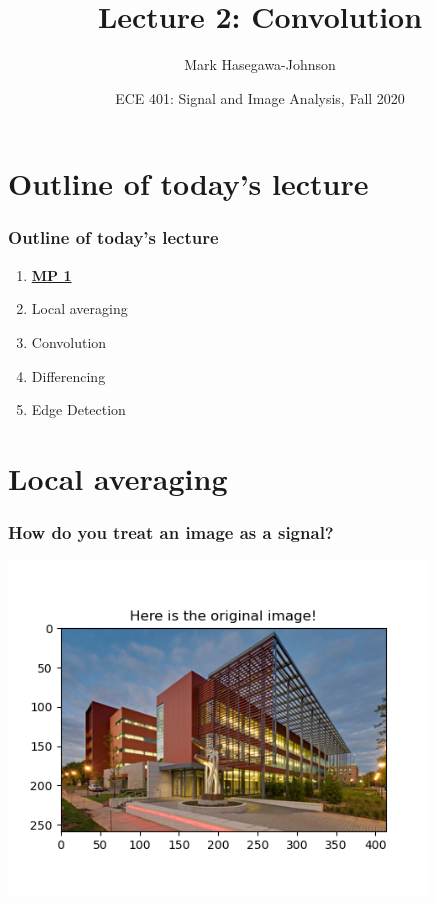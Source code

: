 \documentclass{beamer}
\title{Lecture 2: Convolution}
\author{Mark Hasegawa-Johnson}
\date{ECE 401: Signal and Image Analysis, Fall 2020}
\begin{document}
\begin{frame}
  \maketitle
\end{frame}

\begin{frame}
  \tableofcontents
\end{frame}

\section[Outline]{Outline of today's lecture}
\setcounter{subsection}{1}
\begin{frame}
  \frametitle{Outline of today's lecture}
  \begin{enumerate}
  \item \href{https://courses.engr.illinois.edu/ece401/fa2020/mp1.html}{\bf\color{blue}MP 1}
  \item Local averaging
  \item Convolution
  \item Differencing
  \item Edge Detection
  \end{enumerate}
\end{frame}

\section[Averaging]{Local averaging}
\setcounter{subsection}{1}

\begin{frame}
  \frametitle{How do you treat an image as a signal?}
  \centerline{\includegraphics[height=3.5in]{mp1fig1.png}}
\end{frame}
\end{document}
